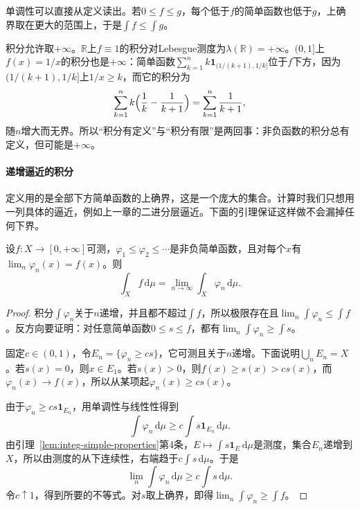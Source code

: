 单调性可以直接从定义读出。若$0\leq f\leq g$，每个低于$f$的简单函数也低于$g$，上确界取在更大的范围上，于是$\int f\leq\int g$。

积分允许取$+\infty$。$\mathbb R$上$f\equiv1$的积分对Lebesgue测度为$\lambda(\mathbb R)=+\infty$。$(0,1]$上$f(x)=1/x$的积分也是$+\infty$：简单函数$\sum_{k=1}^nk\mathbf 1_{(1/(k+1),1/k]}$位于$f$下方，因为$(1/(k+1),1/k]$上$1/x\geq k$，而它的积分为
\[
 \sum_{k=1}^nk\Bigl(\frac1k-\frac1{k+1}\Bigr)=\sum_{k=1}^n\frac1{k+1},
\]
随$n$增大而无界。所以“积分有定义”与“积分有限”是两回事：非负函数的积分总有定义，但可能是$+\infty$。

\paragraph{递增逼近的积分}
定义用的是全部下方简单函数的上确界，这是一个庞大的集合。计算时我们只想用一列具体的逼近，例如上一章的二进分层逼近。下面的引理保证这样做不会漏掉任何下界。

\begin{lemma}[递增简单函数列的积分]
\label{lem:integ-increasing-simple}
设$f:X\to[0,+\infty]$可测，$\varphi_1\leq\varphi_2\leq\cdots$是非负简单函数，且对每个$x$有$\lim_n\varphi_n(x)=f(x)$。则
\begin{equation}
 \int_Xf\,\mathrm d\mu=\lim_{n\to\infty}\int_X\varphi_n\,\mathrm d\mu .
 \label{eq:integ-increasing-simple}
\end{equation}
\end{lemma}

\begin{proof}
积分$\int\varphi_n$关于$n$递增，并且都不超过$\int f$，所以极限存在且$\lim_n\int\varphi_n\leq\int f$。反方向要证明：对任意简单函数$0\leq s\leq f$，都有$\lim_n\int\varphi_n\geq\int s$。

固定$c\in(0,1)$，令$E_n=\{\varphi_n\geq cs\}$，它可测且关于$n$递增。下面说明$\bigcup_nE_n=X$。若$s(x)=0$，则$x\in E_1$。若$s(x)>0$，则$f(x)\geq s(x)>cs(x)$，而$\varphi_n(x)\to f(x)$，所以从某项起$\varphi_n(x)\geq cs(x)$。

由于$\varphi_n\geq cs\mathbf 1_{E_n}$，用单调性与线性性得到
\[
 \int\varphi_n\,\mathrm d\mu\geq c\int s\mathbf 1_{E_n}\,\mathrm d\mu .
\]
由引理~\ref{lem:integ-simple-properties}第4条，$E\mapsto\int s\mathbf 1_E\,\mathrm d\mu$是测度，集合$E_n$递增到$X$，所以由测度的从下连续性，右端趋于$c\int s\,\mathrm d\mu$。于是
\[
 \lim_n\int\varphi_n\,\mathrm d\mu\geq c\int s\,\mathrm d\mu .
\]
令$c\uparrow1$，得到所要的不等式。对$s$取上确界，即得$\lim_n\int\varphi_n\geq\int f$。
\end{proof}

